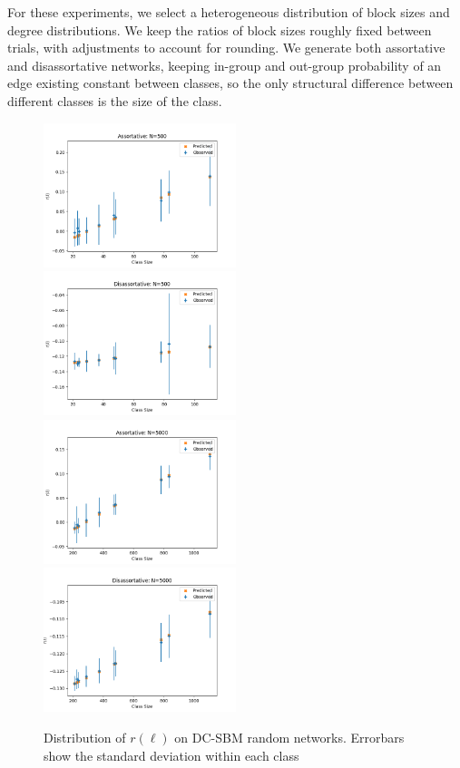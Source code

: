 \documentclass[12pt]{article}
\begin{document}
For these experiments, we select a heterogeneous distribution of block sizes and degree distributions.  We keep the ratios of block sizes roughly fixed between trials, with adjustments to account for rounding.  We generate both assortative and disassortative networks, keeping in-group and out-group probability of an edge existing constant between classes, so the only structural difference between different classes is the size of the class. 

\begin{figure}[h!]
\includegraphics[width=0.5\textwidth]{assortative_N_500.png}
\includegraphics[width=0.5\textwidth]{disassortative_N_500.png}
\includegraphics[width=0.5\textwidth]{assortative_N_5000.png}
\includegraphics[width=0.5\textwidth]{disassortative_N_5000.png}
\caption{Distribution of $r(\ell)$ on DC-SBM random networks.  Errorbars show the standard deviation within each class}
\end{figure}
\end{document}
